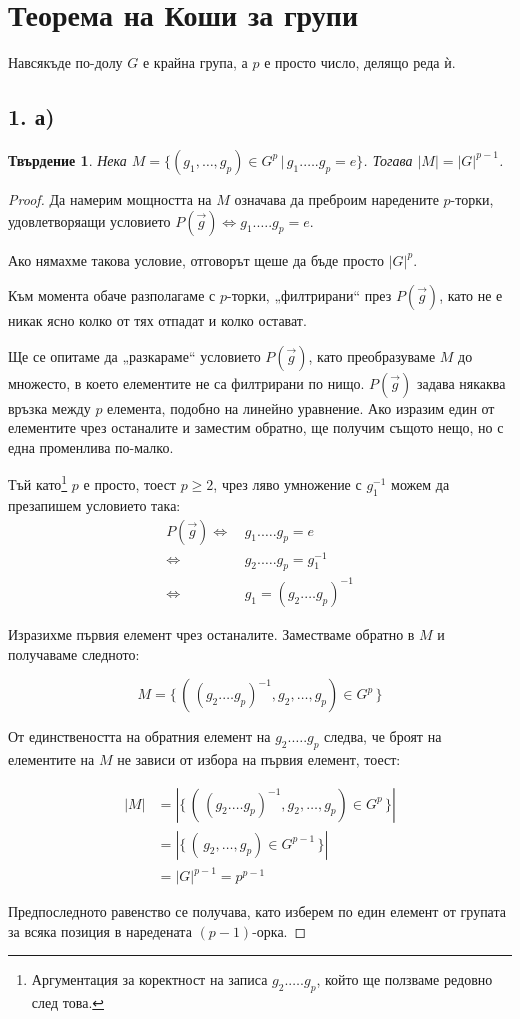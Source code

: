 \documentclass{article}
\newtheorem*{prop}{Твърдение}
\begin{document}
\section*{Теорема на Коши за групи}
Навсякъде по-долу $G$ е крайна група, а $p$ е просто число, делящо реда ѝ.
\subsection*{1. а)}
\begin{prop}
    Нека $M = \{(g_1, \dots, g_p) \in G^p \, | \, g_1.\dots.g_p = e\}$.
    Тогава $|M| = |G|^{p-1}$.
\end{prop}
\begin{proof}
    Да намерим мощността на $M$ означава да преброим наредените $p$-торки, удовлетворяащи условието
    $P(\vec g) \Leftrightarrow {g_1.\dots. g_p = e}$.

    Ако нямахме такова условие, отговорът щеше да бъде просто $|G|^p$.

    Към момента обаче разполагаме с $p$-торки, „филтрирани“ през $P(\vec g)$, като не е никак ясно колко от тях отпадат и колко остават.

    Ще се опитаме да „разкараме“ условието $P(\vec g)$, като преобразуваме $M$ до множесто, в което елементите не са филтрирани по нищо.
    $P(\vec g)$ задава някаква връзка между $p$ елемента, подобно на линейно уравнение. Ако изразим един от елементите чрез останалите и заместим обратно, ще получим същото нещо, но с една променлива по-малко.

    Тъй като\footnote{Аргументация за коректност на записа $g_2 . \dots . g_p$, който ще ползваме редовно след това.} $p$ е просто, тоест $p \ge 2$, чрез ляво умножение с $g_1^{-1}$ можем да презапишем условието така:
    \begin{align*}
        P(\vec g) \Leftrightarrow \, &g_1.\dots.g_p = e \\
        \Leftrightarrow \, &g_2. \dots . g_p = g_1^{-1} \\
        \Leftrightarrow \, &g_1 = (g_2 . \dots g_p)^{-1}
    \end{align*}

    Изразихме първия елемент чрез останалите. Заместваме обратно в $M$ и получаваме следното:

    $$M = \{ \, (\,(g_2 . \dots g_p)^{-1}, g_2, \dots, g_p) \in G^p \,\}$$

    От единствеността на обратния елемент на $g_2.\dots.g_p$ следва, че броят на елементите на $M$ не зависи от избора на първия елемент, тоест:

    \begin{align*}
        |M| &= |\{ \, (\,(g_2 . \dots g_p)^{-1}, g_2, \dots, g_p) \in G^p \,\}|\\
        &= |\{ \, (\, g_2, \dots, g_p) \in G^{p-1} \,\}|\\
        &= {|G|}^{p-1} = p^{p-1}
    \end{align*}

    Предпоследното равенство се получава, като изберем по един елемент от групата за всяка позиция в наредената ${(p-1)}$-орка.
\end{proof}
\end{document}
